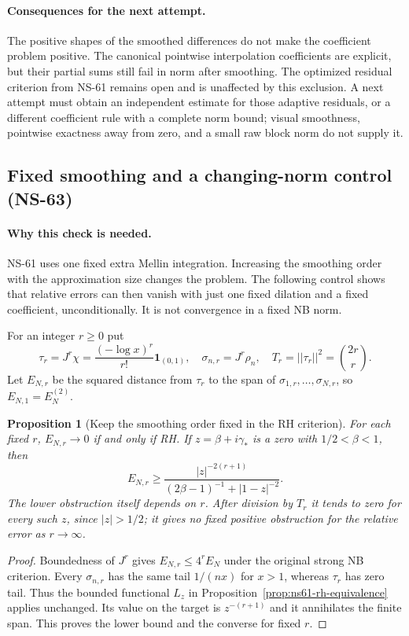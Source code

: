 \documentclass[11pt]{article}
\def\norm#1{||#1||}%
\newtheorem{proposition}[theorem]{Proposition}
\theoremstyle{remark}
\newcommand{\norm}[1]{\left\lVert #1\right\rVert}
\begin{document}
\paragraph{Consequences for the next attempt.}
The positive shapes of the smoothed differences do not make the
coefficient problem positive. The canonical pointwise interpolation
coefficients are explicit, but their partial sums still fail in norm
after smoothing. The optimized residual criterion from NS-61 remains
open and is unaffected by this exclusion. A next attempt must obtain
an independent estimate for those adaptive residuals, or a different
coefficient rule with a complete norm bound; visual smoothness,
pointwise exactness away from zero, and a small raw block norm do not
supply it.

\subsection{Fixed smoothing and a changing-norm control (NS-63)}
\label{sec:ns63-changing-norm}

\paragraph{Why this check is needed.}
NS-61 uses one fixed extra Mellin integration. Increasing the smoothing
order with the approximation size changes the problem. The following
control shows that relative errors can then vanish with just one fixed
dilation and a fixed coefficient, unconditionally. It is not convergence
in a fixed NB norm.

For an integer $r\geq0$ put
\[
 \tau_r=J^r\chi=\frac{(-\log x)^r}{r!}\mathbf1_{(0,1)},\quad
 \sigma_{n,r}=J^r\rho_n,\quad
 T_r=\norm{\tau_r}^2=\binom{2r}{r}.
\]
Let $E_{N,r}$ be the squared distance from $\tau_r$ to the span of
$\sigma_{1,r},\ldots,\sigma_{N,r}$, so $E_{N,1}=E_N^{(2)}$.

\begin{proposition}[Keep the smoothing order fixed in the RH criterion]
\label{prop:ns63-fixed-order}
For each fixed $r$, $E_{N,r}\to0$ if and only if RH. If
$z=\beta+i\gamma_*$ is a zero with $1/2<\beta<1$, then
\[
 E_{N,r}\geq
 \frac{|z|^{-2(r+1)}}{(2\beta-1)^{-1}+|1-z|^{-2}}.
\]
The lower obstruction itself depends on $r$. After division by $T_r$
it tends to zero for every such $z$, since $|z|>1/2$; it gives no
fixed positive obstruction for the relative error as $r\to\infty$.
\end{proposition}
\begin{proof}
Boundedness of $J^r$ gives $E_{N,r}\leq4^rE_N$ under the original
strong NB criterion. Every $\sigma_{n,r}$ has the same tail $1/(nx)$
for $x>1$, whereas $\tau_r$ has zero tail. Thus the bounded functional
$L_z$ in Proposition~\ref{prop:ns61-rh-equivalence} applies unchanged.
Its value on the target is $z^{-(r+1)}$ and it annihilates the finite
span. This proves the lower bound and the converse for fixed $r$.
\end{proof}
\end{document}
